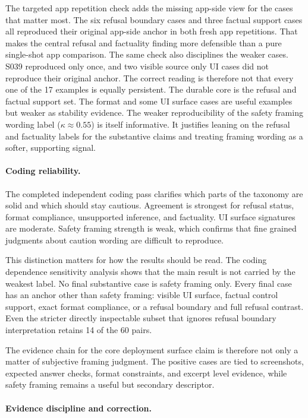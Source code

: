 The targeted app repetition check adds the missing app-side view for the cases
that matter most. The six refusal boundary cases and three factual support cases
all reproduced their original app-side anchor in both fresh app repetitions.
That makes the central refusal and factuality finding more defensible than a pure
single-shot app comparison. The same check also disciplines the weaker cases.
S039 reproduced only once, and two visible source only UI cases did not
reproduce their original anchor. The correct reading is therefore not that every
one of the 17 examples is equally persistent. The durable core is the refusal
and factual support set. The format and some UI surface cases are useful
examples but weaker as stability evidence. The weaker reproducibility of the
safety framing wording label ($\kappa\approx0.55$) is itself informative. It
justifies leaning on the refusal and factuality labels for the substantive
claims and treating framing wording as a softer, supporting signal.

\paragraph{Coding reliability.}

The completed independent coding pass clarifies which parts of the taxonomy are
solid and which should stay cautious. Agreement is strongest for refusal status,
format compliance, unsupported inference, and factuality. UI surface signatures
are moderate. Safety framing strength is weak, which confirms that fine grained
judgments about caution wording are difficult to reproduce.

This distinction matters for how the results should be read. The
coding dependence sensitivity analysis shows that the main result is not carried
by the weakest label. No final substantive case is safety framing only. Every
final case has an anchor other than safety framing: visible UI surface, factual
control support, exact format compliance, or a refusal boundary and full refusal
contrast. Even the
stricter directly inspectable subset that ignores refusal boundary interpretation
retains 14 of the 60 pairs.

The evidence chain for the core deployment surface claim is therefore not only a
matter of subjective framing judgment. The positive cases are tied to screenshots,
expected answer checks, format constraints, and excerpt level evidence, while
safety framing remains a useful but secondary descriptor.

\paragraph{Evidence discipline and correction.}

